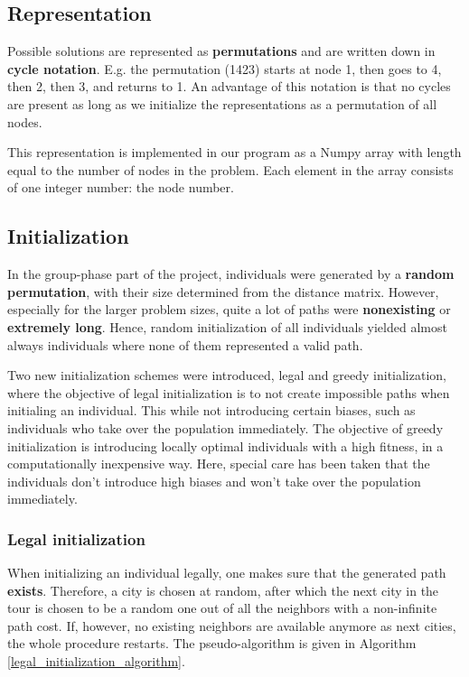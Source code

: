 \documentclass[a4paper,10pt]{article}
\begin{document}

%

\clearpage
\subsection{Representation}
Possible solutions are represented as \textbf{permutations} and are written down in \textbf{cycle notation}. E.g. the permutation (1423) starts at node 1, then goes to 4, then 2, then 3, and returns to 1. An advantage of this notation is that no cycles are present as long as we initialize the representations as a permutation of all nodes. 

This representation is implemented in our program as a Numpy array with length equal to the number of nodes in the problem. Each element in the array consists of one integer number: the node number.

\subsection{Initialization}
\label{initialization}
In the group-phase part of the project, individuals were generated by a \textbf{random permutation}, with their size determined from the distance matrix. However, especially for the larger problem sizes, quite a lot of paths were \textbf{nonexisting} or \textbf{extremely long}. Hence, random initialization of all individuals yielded almost always individuals where none of them represented a valid path. 

Two new initialization schemes were introduced, legal and greedy initialization, where the objective of legal initialization is to not create impossible paths when initialing an individual. This while not introducing certain biases, such as individuals who take over the population immediately. The objective of greedy initialization is introducing locally optimal individuals with a high fitness, in a computationally inexpensive way. Here, special care has been taken that the individuals don't introduce high biases and won't take over the population immediately.

\subsubsection{Legal initialization}
When initializing an individual legally, one makes sure that the generated path \textbf{exists}. Therefore, a city is chosen at random, after which the next city in the tour is chosen to be a random one out of all the neighbors with a non-infinite path cost. If, however, no existing neighbors are available anymore as next cities, the whole procedure restarts. The pseudo-algorithm is given in Algorithm \ref{legal_initialization_algorithm}.
\end{document}
